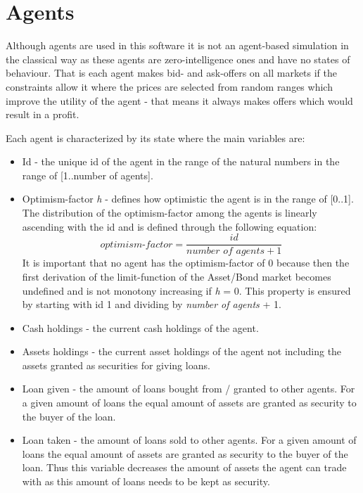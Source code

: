 \documentclass[Bachelorarbeit.tex]{subfiles}
\begin{document}
\section{Agents}
\label{sec:AGENTS}
Although agents are used in this software it is not an agent-based simulation in the classical way as these agents are zero-intelligence ones and have no states of behaviour. That is each agent makes bid- and ask-offers on all markets if the constraints allow it where the prices are selected from random ranges which improve the utility of the agent - that means it always makes offers which would result in a profit.

\medskip

Each agent is characterized by its state where the main variables are:

\begin{itemize}
\item Id - the unique id of the agent in the range of the natural numbers in the range of [1..number of agents].
\item Optimism-factor \textit{h} - defines how optimistic the agent is in the range of [0..1]. The distribution of the optimism-factor among the agents is linearly ascending with the id and is defined through the following equation: 
\begin{equation}
\textit{optimism-factor} = \frac{id}{\textit{number of agents} + 1}
\end{equation}
It is important that no agent has the optimism-factor of 0 because then the first derivation of the limit-function of the Asset/Bond market becomes undefined and is not monotony increasing if \textit{h} = 0. This property is ensured by starting with id 1 and dividing by \textit{number of agents} + 1.
\item Cash holdings - the current cash holdings of the agent.
\item Assets holdings - the current asset holdings of the agent not including the assets granted as securities for giving loans.
\item Loan given - the amount of loans bought from / granted to other agents. For a given amount of loans the equal amount of assets are granted as security to the buyer of the loan.
\item Loan taken - the amount of loans sold to other agents. For a given amount of loans the equal amount of assets are granted as security to the buyer of the loan. Thus this variable decreases the amount of assets the agent can trade with as this amount of loans needs to be kept as security.
\end{itemize}
\end{document}
